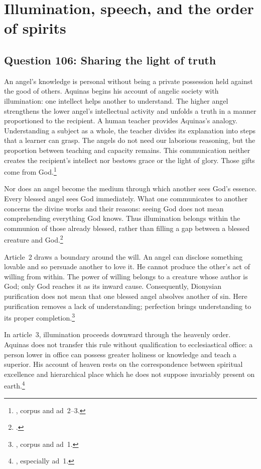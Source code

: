 \section{Illumination, speech, and the order of spirits}

\subsection{Question 106: Sharing the light of truth}\label{q106}
An angel's knowledge is personal without being a private possession held against the good of others. Aquinas begins his account of angelic society with illumination: one intellect helps another to understand. The higher angel strengthens the lower angel's intellectual activity and unfolds a truth in a manner proportioned to the recipient. A human teacher provides Aquinas's analogy. Understanding a subject as a whole, the teacher divides its explanation into steps that a learner can grasp. The angels do not need our laborious reasoning, but the proportion between teaching and capacity remains. This communication neither creates the recipient's intellect nor bestows grace or the light of glory. Those gifts come from God.\footnote{, corpus and ad~2--3.}

Nor does an angel become the medium through which another sees God's essence. Every blessed angel sees God immediately. What one communicates to another concerns the divine works and their reasons: seeing God does not mean comprehending everything God knows. Thus illumination belongs within the communion of those already blessed, rather than filling a gap between a blessed creature and God.\footnote{.}

Article~2 draws a boundary around the will. An angel can disclose something lovable and so persuade another to love it. He cannot produce the other's act of willing from within. The power of willing belongs to a creature whose author is God; only God reaches it as its inward cause. Consequently, Dionysian purification does not mean that one blessed angel absolves another of sin. Here purification removes a lack of understanding; perfection brings understanding to its proper completion.\footnote{, corpus and ad~1.}

In article~3, illumination proceeds downward through the heavenly order. Aquinas does not transfer this rule without qualification to ecclesiastical office: a person lower in office can possess greater holiness or knowledge and teach a superior. His account of heaven rests on the correspondence between spiritual excellence and hierarchical place which he does not suppose invariably present on earth.\footnote{, especially ad~1.}

